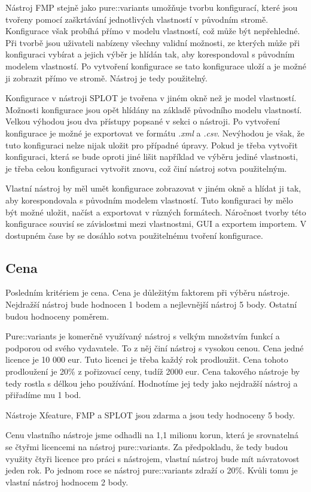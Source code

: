 Nástroj FMP stejně jako pure::variants umožňuje tvorbu konfigurací, které jsou tvořeny pomocí zaškrtávání jednotlivých vlastností v původním stromě. Konfigurace však probíhá přímo v modelu vlastností, což může být nepřehledné. Při tvorbě jsou uživateli nabízeny všechny validní možnosti, ze kterých může při konfiguraci vybírat a jejich výběr je hlídán tak, aby korespondoval s původním modelem vlastností. Po vytvoření konfigurace se tato konfigurace uloží a je možné ji zobrazit přímo ve stromě. Nástroj je tedy použitelný.

Konfigurace v nástroji SPLOT je tvořena v jiném okně než je model vlastností. Možnosti konfigurace jsou opět hlídány na základě původního modelu vlastností. Velkou výhodou jsou dva přístupy popsané v sekci o nástroji. Po vytvoření konfigurace je možné je exportovat ve formátu \textit{.xml} a \textit{.csv}. Nevýhodou je však, že tuto konfiguraci nelze nijak uložit pro případné úpravy. Pokud je třeba vytvořit konfiguraci, která se bude oproti jiné lišit například ve výběru jediné vlastnosti, je třeba celou konfiguraci vytvořit znovu, což činí nástroj sotva použitelným.

Vlastní nástroj by měl umět konfigurace zobrazovat v jiném okně a hlídat ji tak, aby korespondovala s původním modelem vlastností. Tuto konfiguraci by mělo být možné uložit, načíst a exportovat v různých formátech. Náročnost tvorby této konfigurace souvisí se závislostmi mezi vlastnostmi, GUI a exportem importem. V dostupném čase by se dosáhlo sotva použitelnému tvoření konfigurace.

\subsection{Cena}
Posledním kritériem je cena. Cena je důležitým faktorem při výběru nástroje. Nejdražší nástroj bude hodnocen 1 bodem a nejlevnější nástroj 5 body. Ostatní budou hodnoceny poměrem.

Pure::variants je komerčně využívaný nástroj s velkým množstvím funkcí a podporou od svého vydavatele. To z něj činí nástroj s vysokou cenou. Cena jedné licence je 10 000 eur. Tuto licenci je třeba každý rok prodloužit. Cena tohoto prodloužení je 20\% z pořizovací ceny, tudíž 2000 eur. Cena takového nástroje by tedy rostla s délkou jeho používání. Hodnotíme jej tedy jako nejdražší nástroj a přiřadíme mu 1 bod. 

Nástroje Xfeature, FMP a SPLOT jsou zdarma a jsou tedy hodnoceny 5 body. 

Cenu vlastního nástroje jsme odhadli na 1,1 milionu korun, která je srovnatelná se čtyřmi licencemi na nástroj pure::variants. Za předpokladu, že tedy budou využity čtyři licence pro práci s nástrojem, vlastní nástroj bude mít návratovost jeden rok. Po jednom roce se nástroj pure::variants zdraží o 20\%. Kvůli tomu je vlastní nástroj hodnocem 2 body.

